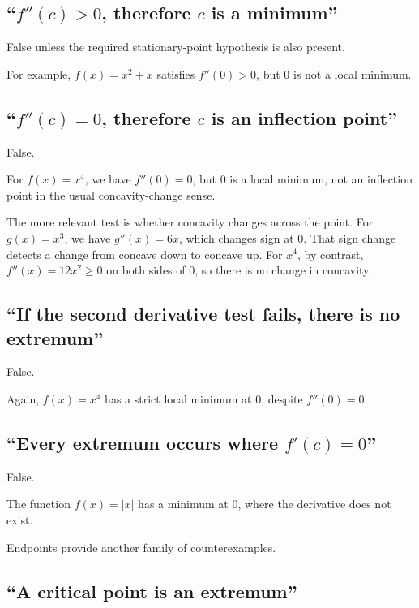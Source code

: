\documentclass{essay}
\begin{document}
\subsection{\texorpdfstring{``\(f''(c)>0\), therefore \(c\) is a minimum''}{``f''(c)>0, therefore c is a minimum''}}

False unless the required stationary-point hypothesis is also present.

For example, \(f(x)=x^2+x\) satisfies \(f''(0)>0\), but \(0\) is not a local minimum.

\subsection{\texorpdfstring{``\(f''(c)=0\), therefore \(c\) is an inflection point''}{``f''(c)=0, therefore c is an inflection point''}}

False.

For \(f(x)=x^4\), we have \(f''(0)=0\), but \(0\) is a local minimum, not an inflection point in the usual concavity-change sense.

The more relevant test is whether concavity changes across the point. For \(g(x)=x^3\), we have \(g''(x)=6x\), which changes sign at \(0\). That sign change detects a change from concave down to concave up. For \(x^4\), by contrast, \(f''(x)=12x^2\geq0\) on both sides of \(0\), so there is no change in concavity.

\subsection{``If the second derivative test fails, there is no extremum''}

False.

Again, \(f(x)=x^4\) has a strict local minimum at \(0\), despite \(f''(0)=0\).

\subsection{\texorpdfstring{``Every extremum occurs where \(f'(c)=0\)''}{``Every extremum occurs where f'(c)=0''}}

False.

The function \(f(x)=|x|\) has a minimum at \(0\), where the derivative does not exist.

Endpoints provide another family of counterexamples.

\subsection{``A critical point is an extremum''}
\end{document}
